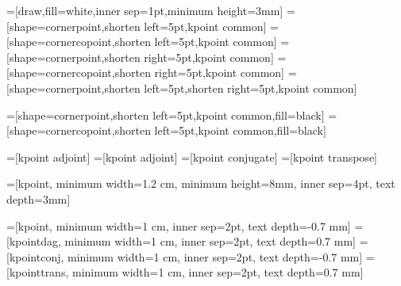 
\makeatother


=[draw,fill=white,inner sep=1pt,minimum height=3mm]
=[shape=cornerpoint,shorten left=5pt,kpoint common]
=[shape=cornercopoint,shorten left=5pt,kpoint common]
=[shape=cornerpoint,shorten right=5pt,kpoint common]
=[shape=cornercopoint,shorten right=5pt,kpoint common]
=[shape=cornerpoint,shorten left=5pt,shorten right=5pt,kpoint common]

=[shape=cornerpoint,shorten left=5pt,kpoint common,fill=black]
=[shape=cornercopoint,shorten left=5pt,kpoint common,fill=black]

=[kpoint adjoint]
=[kpoint adjoint]
=[kpoint conjugate]
=[kpoint transpose]

=[kpoint, minimum width=1.2 cm, minimum height=8mm, inner sep=4pt, text depth=3mm]

=[kpoint, minimum width=1 cm, inner sep=2pt, text depth=-0.7 mm]
=[kpointdag, minimum width=1 cm, inner sep=2pt, text depth=0.7 mm]
=[kpointconj, minimum width=1 cm, inner sep=2pt, text depth=-0.7 mm]
=[kpointtrans, minimum width=1 cm, inner sep=2pt, text depth=0.7 mm]

